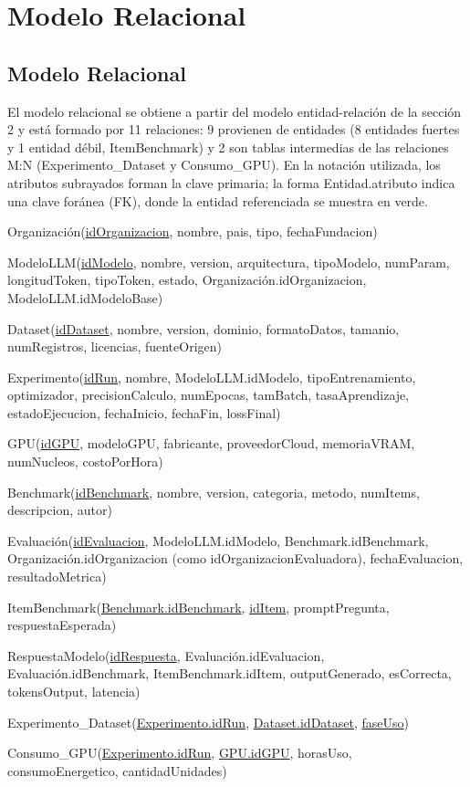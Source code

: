 \documentclass[12pt,a4paper]{article}
\newcommand{\fk}[2]{\textcolor{verdeFK}{#1}\textcolor{azulRel}{.\allowbreak #2}}
\begin{document}
\section{Modelo Relacional}

\subsection{Modelo Relacional}

El modelo relacional se obtiene a partir del modelo entidad-relación de la sección 2 y está formado por 11 relaciones: 9 provienen de entidades (8 entidades fuertes y 1 entidad débil, ItemBenchmark) y 2 son tablas intermedias de las relaciones M:N (Experimento\_Dataset y Consumo\_GPU). En la notación utilizada, los atributos subrayados forman la clave primaria; la forma \textcolor{verdeFK}{Entidad}\textcolor{azulRel}{.atributo} indica una clave foránea (FK), donde la entidad referenciada se muestra en verde.

\begin{itemize}[label={},leftmargin=0.635cm,itemsep=9pt]
{\color{azulRel}\raggedright
  \item Organización(\underline{idOrganizacion}, nombre, pais, tipo, fechaFundacion)
  \item ModeloLLM(\underline{idModelo}, nombre, version, arquitectura, tipoModelo, numParam, longitudToken, tipoToken, estado, \fk{Organización}{idOrganizacion}, \fk{ModeloLLM}{idModeloBase})
  \item Dataset(\underline{idDataset}, nombre, version, dominio, formatoDatos, tamanio, numRegistros, licencias, fuenteOrigen)
  \item Experimento(\underline{idRun}, nombre, \fk{ModeloLLM}{idModelo}, tipoEntrenamiento, optimizador, precisionCalculo, numEpocas, tamBatch, tasaAprendizaje, estadoEjecucion, fechaInicio, fechaFin, lossFinal)
  \item GPU(\underline{idGPU}, modeloGPU, fabricante, proveedorCloud, memoriaVRAM, numNucleos, costoPorHora)
  \item Benchmark(\underline{idBenchmark}, nombre, version, categoria, metodo, numItems, descripcion, autor)
  \item Evaluación(\underline{idEvaluacion}, \fk{ModeloLLM}{idModelo}, \fk{Benchmark}{idBenchmark}, \fk{Organización}{idOrganizacion} (como idOrganizacionEvaluadora), fechaEvaluacion, resultadoMetrica)
  \item ItemBenchmark(\underline{\fk{Benchmark}{idBenchmark}}, \underline{idItem}, promptPregunta, respuestaEsperada)
  \item RespuestaModelo(\underline{idRespuesta}, \fk{Evaluación}{idEvaluacion}, \fk{Evaluación}{idBenchmark}, \fk{ItemBenchmark}{idItem}, outputGenerado, esCorrecta, tokensOutput, latencia)
  \item Experimento\_Dataset(\underline{\fk{Experimento}{idRun}}, \underline{\fk{Dataset}{idDataset}}, \underline{faseUso})
  \item Consumo\_GPU(\underline{\fk{Experimento}{idRun}}, \underline{\fk{GPU}{idGPU}}, horasUso, consumoEnergetico, cantidadUnidades)
}
\end{itemize}
\end{document}
